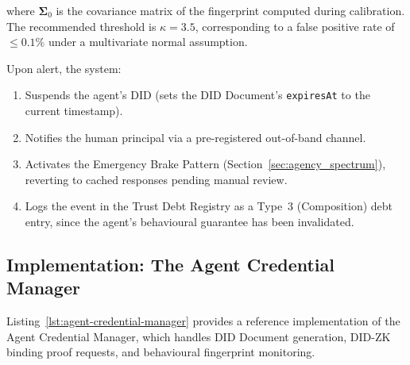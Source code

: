 where $\boldsymbol{\Sigma}_0$ is the covariance matrix of the
fingerprint computed during calibration.
The recommended threshold is $\kappa = 3.5$, corresponding to
a false positive rate of $\leq 0.1\%$ under a multivariate
normal assumption.

Upon alert, the system:
\begin{enumerate}
  \item Suspends the agent's DID (sets the DID Document's
    \texttt{expiresAt} to the current timestamp).
  \item Notifies the human principal via a pre-registered
    out-of-band channel.
  \item Activates the Emergency Brake Pattern
    (Section~\ref{sec:agency_spectrum}), reverting to
    cached responses pending manual review.
  \item Logs the event in the Trust Debt Registry as a
    Type~3 (Composition) debt entry, since the agent's
    behavioural guarantee has been invalidated.
\end{enumerate}

\subsection{Implementation: The Agent Credential Manager}
\label{subsec:agent-credential-impl}

Listing~\ref{lst:agent-credential-manager} provides a
reference implementation of the Agent Credential Manager,
which handles DID Document generation, DID-ZK binding proof
requests, and behavioural fingerprint monitoring.

